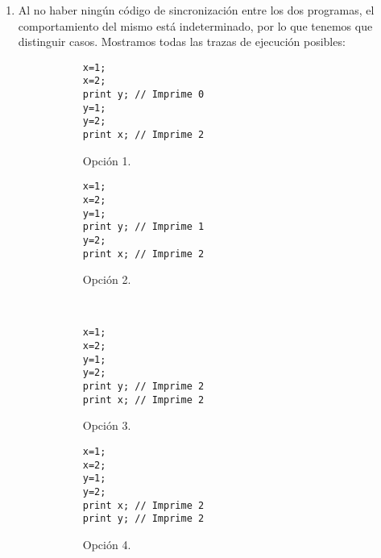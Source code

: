 \begin{ejercicio}
    \begin{enumerate}
        \item Al no haber ningún código de sincronización entre los dos programas, el comportamiento del mismo está indeterminado, por lo que tenemos que distinguir casos. Mostramos todas las trazas de ejecución posibles:
\begin{figure}[H]
    \centering
    \begin{subfigure}{0.3\textwidth}
        \begin{verbatim}
x=1;
x=2;
print y; // Imprime 0
y=1;
y=2;
print x; // Imprime 2
        \end{verbatim}
        \caption{Opción 1.}
    \end{subfigure}\hspace{3cm}
    \begin{subfigure}{0.3\textwidth}
        \begin{verbatim}
x=1;
x=2;
y=1;
print y; // Imprime 1
y=2;
print x; // Imprime 2
        \end{verbatim}
        \caption{Opción 2.}            
    \end{subfigure}
    \\
    \begin{subfigure}{0.3\textwidth}
        \begin{verbatim}
x=1;
x=2;
y=1;
y=2;
print y; // Imprime 2
print x; // Imprime 2
        \end{verbatim}
        \caption{Opción 3.}
    \end{subfigure}\hspace{3cm}
    \begin{subfigure}{0.3\textwidth}
        \begin{verbatim}
x=1;
x=2;
y=1;
y=2;
print x; // Imprime 2
print y; // Imprime 2
        \end{verbatim}
        \caption{Opción 4.}            
    \end{subfigure}
    \\
    \begin{subfigure}{0.3\textwidth}

\end{subfigure}
\end{figure}
\end{enumerate}
\end{ejercicio}
